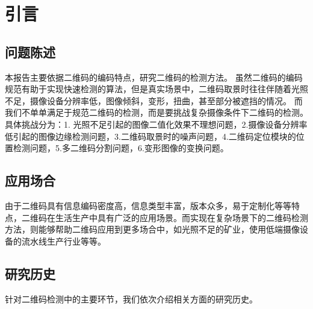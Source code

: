 \section{引言}
\subsection{问题陈述}
本报告主要依据二维码的编码特点，研究二维码的检测方法。
虽然二维码的编码规范有助于实现快速检测的算法，但是真实场景中，二维码取景时往往伴随着光照不足，摄像设备分辨率低，图像倾斜，变形，扭曲，甚至部分被遮挡的情况。
而我们不单单满足于规范二维码的检测，而是要挑战复杂摄像条件下二维码的检测。\\
具体挑战分为：1. 光照不足引起的图像二值化效果不理想问题，2.摄像设备分辨率低引起的图像边缘检测问题，3.二维码取景时的噪声问题，4.二维码定位模块的位置检测问题，5.多二维码分割问题，6.变形图像的变换问题。

\subsection{应用场合}
由于二维码具有信息编码密度高，信息类型丰富，版本众多，易于定制化等等特点，二维码在生活生产中具有广泛的应用场景。而实现在复杂场景下的二维码检测方法，则能够帮助二维码应用到更多场合中，如光照不足的矿业，使用低端摄像设备的流水线生产行业等等。

\subsection{研究历史}
针对二维码检测中的主要环节，我们依次介绍相关方面的研究历史。

